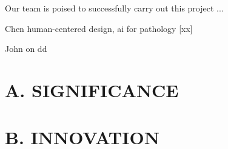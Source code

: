 


Our team is poised to successfully carry out this project ...

Chen human-centered design, ai for pathology [xx]

John on dd

\section*{A. SIGNIFICANCE}








\section*{B. INNOVATION}


